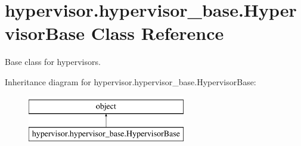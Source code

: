 \hypertarget{classhypervisor_1_1hypervisor__base_1_1HypervisorBase}{\section{hypervisor.\-hypervisor\-\_\-base.\-Hypervisor\-Base Class Reference}
\label{classhypervisor_1_1hypervisor__base_1_1HypervisorBase}
}


Base class for hypervisors.  


Inheritance diagram for hypervisor.\-hypervisor\-\_\-base.\-Hypervisor\-Base\-:\begin{figure}[H]
\begin{center}
\leavevmode
\includegraphics[height=2.000000cm]{classhypervisor_1_1hypervisor__base_1_1HypervisorBase}
\end{center}
\end{figure}
